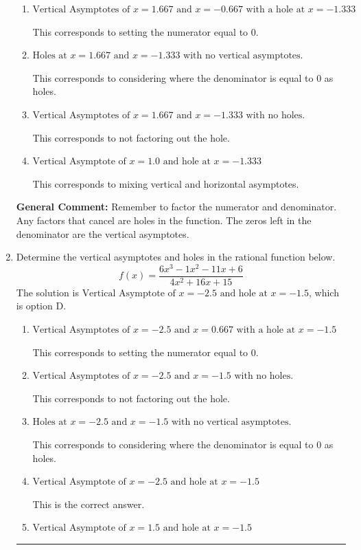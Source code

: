 \documentclass{extbook}[14pt]
\newcommand{\litem}[1]{\item #1

\rule{\textwidth}{0.4pt}}
\begin{document}
\begin{enumerate}
{\begin{enumerate}[label=\Alph*.]
This is the correct answer.
\item \( \text{Vertical Asymptotes of } x = 1.667 \text{ and } x = -0.667 \text{ with a hole at } x = -1.333 \)

This corresponds to setting the numerator equal to 0.
\item \( \text{Holes at } x = 1.667 \text{ and } x = -1.333 \text{ with no vertical asymptotes.} \)

This corresponds to considering where the denominator is equal to 0 as holes.
\item \( \text{Vertical Asymptotes of } x = 1.667 \text{ and } x = -1.333 \text{ with no holes.} \)

This corresponds to not factoring out the hole.
\item \( \text{Vertical Asymptote of } x = 1.0 \text{ and hole at } x = -1.333 \)

This corresponds to mixing vertical and horizontal asymptotes.
\end{enumerate}

\textbf{General Comment:} Remember to factor the numerator and denominator. Any factors that cancel are holes in the function. The zeros left in the denominator are the vertical asymptotes.
}
\litem{
Determine the vertical asymptotes and holes in the rational function below.
\[ f(x) = \frac{6x^{3} -1 x^{2} -11 x + 6}{4x^{2} +16 x + 15} \]The solution is \( \text{Vertical Asymptote of } x = -2.5 \text{ and hole at } x = -1.5 \), which is option D.\begin{enumerate}[label=\Alph*.]
\item \( \text{Vertical Asymptotes of } x = -2.5 \text{ and } x = 0.667 \text{ with a hole at } x = -1.5 \)

This corresponds to setting the numerator equal to 0.
\item \( \text{Vertical Asymptotes of } x = -2.5 \text{ and } x = -1.5 \text{ with no holes.} \)

This corresponds to not factoring out the hole.
\item \( \text{Holes at } x = -2.5 \text{ and } x = -1.5 \text{ with no vertical asymptotes.} \)

This corresponds to considering where the denominator is equal to 0 as holes.
\item \( \text{Vertical Asymptote of } x = -2.5 \text{ and hole at } x = -1.5 \)

This is the correct answer.
\item \( \text{Vertical Asymptote of } x = 1.5 \text{ and hole at } x = -1.5 \)


\end{enumerate}}
\end{enumerate}
\end{document}
